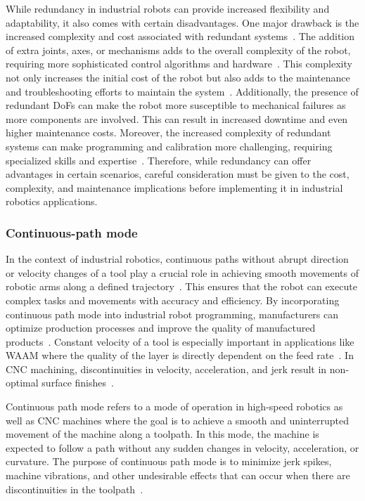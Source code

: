 While redundancy in industrial robots can provide increased flexibility and adaptability, it also comes with certain disadvantages. One major drawback is the increased complexity and cost associated with redundant systems~\cite{Halevi.2011}. The addition of extra joints, axes, or mechanisms adds to the overall complexity of the robot, requiring more sophisticated control algorithms and hardware~\cite{Duong.2021}. This complexity not only increases the initial cost of the robot but also adds to the maintenance and troubleshooting efforts to maintain the system~\cite{Ahangar.2019}. Additionally, the presence of redundant \acrshort{DoF}s can make the robot more susceptible to mechanical failures as more components are involved. This can result in increased downtime and even higher maintenance costs. Moreover, the increased complexity of redundant systems can make programming and calibration more challenging, requiring specialized skills and expertise~\cite{Erdos.2016}. Therefore, while redundancy can offer advantages in certain scenarios, careful consideration must be given to the cost, complexity, and maintenance implications before implementing it in industrial robotics applications.




\subsubsection{Continuous-path mode}\label{CPM}
In the context of industrial robotics, continuous paths without abrupt direction or velocity changes of a tool play a crucial role in achieving smooth movements of robotic arms along a defined trajectory~\cite{Jia.2018}. This ensures that the robot can execute complex tasks and movements with accuracy and efficiency. By incorporating continuous path mode into industrial robot programming, manufacturers can optimize production processes and improve the quality of manufactured products~\cite{Zhang.2020}. Constant velocity of a tool is especially important in applications like \acrshort{WAAM} where the quality of the layer is directly dependent on the feed rate~\cite{Li.2018b}. In \acrshort{CNC} machining, discontinuities in velocity, acceleration, and jerk result in non-optimal surface finishes~\cite{Sun.2021}.


Continuous path mode refers to a mode of operation in high-speed robotics as well as \acrshort{CNC} machines where the goal is to achieve a smooth and uninterrupted movement of the machine along a toolpath. In this mode, the machine is expected to follow a path without any sudden changes in velocity, acceleration, or curvature. The purpose of continuous path mode is to minimize jerk spikes, machine vibrations, and other undesirable effects that can occur when there are discontinuities in the toolpath~\cite{Jia.2018, Yang.2017}.

